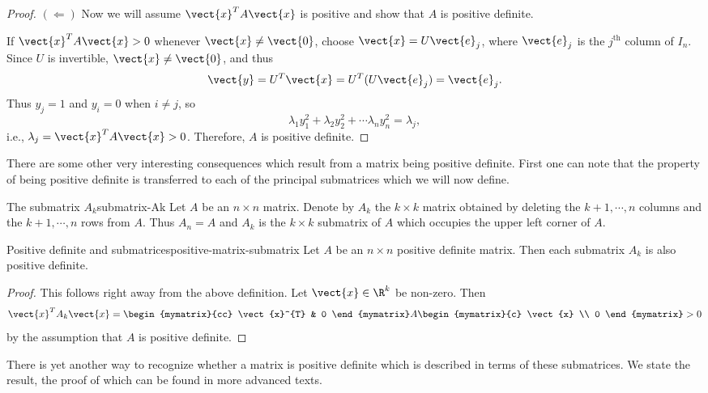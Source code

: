 \begin{proof}
$(\Leftarrow)$ Now we will assume $\vect{x}^T A \vect{x} $ is positive and show that $A$ is positive definite.

If $\vect{x}^TA\vect{x}>0$ whenever $\vect{x}\neq \vect{0}$,
choose $\vect{x}=U\vect{e}_j$, where $\vect{e}_j$ is the $j^{\mbox{th}}$
column of $I_n$.
Since $U$ is invertible, $\vect{x}\neq\vect{0}$, 
and thus
\[ \vect{y}=U^T\vect{x}=U^T(U\vect{e}_j) =\vect{e}_j.\]
Thus $y_j=1$ and $y_i=0$ when $i\neq j$, so
\[ \lambda_1 y_1^2 + \lambda_2 y_2^2 + \cdots \lambda_n y_n^2
=\lambda_j,\]
i.e., $\lambda_j=\vect{x}^TA\vect{x}>0$.
Therefore, $A$ is positive definite.
\end{proof}

There are some other very interesting consequences which result from a
matrix being positive definite. First one can note that the property of
being positive definite is transferred to each of the principal submatrices which we will now define.

\begin{definition}{The submatrix $A_k$}{submatrix-Ak}
Let $A$ be an $n\times n$ matrix. Denote by $A_{k}$ the $k\times k$ matrix
obtained by deleting the $k+1,\cdots ,n$ columns and the $k+1,\cdots ,n$
rows from $A$. Thus $A_{n}=A$ and $A_{k}$ is the $k\times k$ submatrix of $A$
which occupies the upper left corner of $A$.
\end{definition}

\begin{lemma}{Positive definite and submatrices}{positive-matrix-submatrix}
Let $A$ be an $n\times n$ positive definite matrix.  Then each submatrix $A_{k}$ is also positive definite.
\end{lemma}

\begin{proof}
This follows right away from the above definition. Let $\vect{x}\in \R^{k}$ be non-zero. Then 
\begin{equation*}
\vect{x}^{T}A_{k}\vect{x}=\begin{mymatrix}{cc}
\vect{x}^{T} & 0
\end{mymatrix} A\begin{mymatrix}{c}
\vect{x} \\ 
0
\end{mymatrix} >  0
\end{equation*}
by the assumption that $A$ is positive definite.
\end{proof}

There is yet another way to recognize whether a matrix is positive definite
which is described in terms of these submatrices. We state the result,  the proof
of which can be found in more advanced texts.

